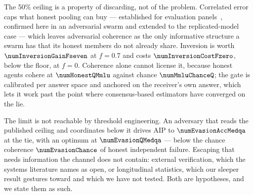The 50\% ceiling is a property of discarding, not of the problem. Correlated error
caps what honest pooling can buy --- established for evaluation
panels~\cite{judgecorr,panelcorr}, confirmed here in an adversarial swarm and
extended to the replicated-model case --- which leaves adversarial coherence as
the only informative structure a swarm has that its honest members do not already
share. Inversion is worth $\numInversionGainFseven$ at $f=0.7$ and costs
$\numInversionCostFzero$, below the floor, at $f=0$. Coherence alone cannot
license it, because honest agents cohere at $\numHonestQMmlu$ against chance
$\numMmluChanceQ$; the gate is calibrated per answer space and anchored on the
receiver's own answer, which lets it work past the point where consensus-based
estimators have converged on the lie.

The limit is not reachable by threshold engineering. An adversary that reads the
published ceiling and coordinates below it drives AIP to $\numEvasionAccMedqa$ at
the tie, with an optimum at $\numEvasionQMedqa$ --- below the chance coherence
$\numEvasionChance$ of honest independent failure. Escaping that needs
information the channel does not contain: external verification, which the
systems literature names as open, or longitudinal statistics, which our sleeper
result gestures toward and which we have not tested. Both are hypotheses, and we
state them as such.
